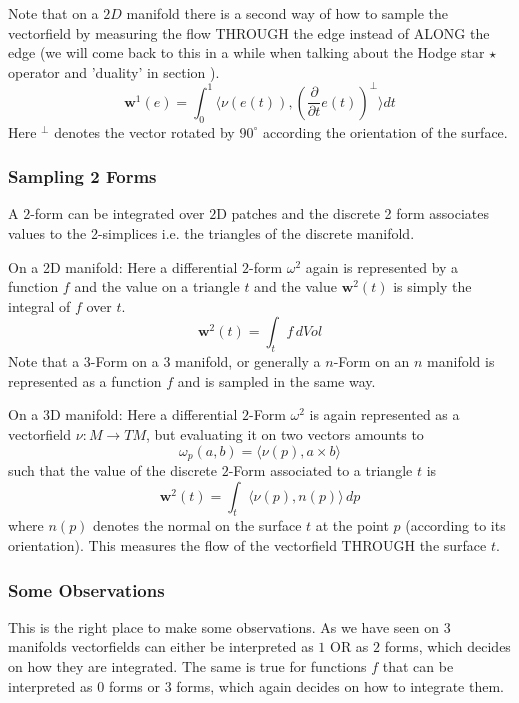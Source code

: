 Note that on a $2D$ manifold there is a second way of how to sample the vectorfield by measuring the flow THROUGH the edge instead of ALONG the edge (we will come back to this in a while when talking about the Hodge star $\star$ operator and 'duality' in section \note{[...]}). 
\[\textbf{w}^1(e) = \int_{0}^1 \langle\nu(e(t)),\left(\frac{\partial}{\partial t}e(t)\right)^\perp \rangle dt\]
Here $^\perp$ denotes the vector rotated by $90^\circ$ according the orientation of the surface.

\subsubsection{Sampling 2 Forms}
A $2$-form can be integrated over $2$D patches and the discrete 2 form associates values to the 2-simplices i.e. the triangles of the discrete manifold.

On a 2D manifold: Here a differential $2$-form $\omega^2$ again is represented by a function $f$ and the value on a triangle $t$ and the value $\textbf{w}^2(t)$ is simply the integral of $f$ over $t$.
\[\textbf{w}^2(t)= \int_{t} f\, dVol\]
Note that a $3$-Form on a 3 manifold, or generally a $n$-Form on an $n$ manifold is represented as a function $f$ and is sampled in the same way.

On a 3D manifold: Here a differential $2$-Form $\omega^2$ is again represented as a vectorfield $\nu: M\to TM$, but evaluating it on two vectors amounts to
\[\omega_p(a,b) = \langle \nu(p) , a \times b \rangle\]
such that the value of the discrete $2$-Form associated to a triangle $t$ is
\[\textbf{w}^2(t)= \int_{t} \langle \nu(p), n(p) \rangle \, dp\]
where $n(p)$ denotes the normal on the surface $t$ at the point $p$ (according to its orientation). This measures the flow of the vectorfield THROUGH the surface $t$. 

\subsubsection{Some Observations}
 This is the right place to make some observations. As we have seen on 3 manifolds vectorfields can either be interpreted as $1$ OR as $2$ forms, which decides on how they are integrated. The same is true for functions $f$ that can be interpreted as $0$ forms or $3$ forms, which again decides on how to integrate them. 

